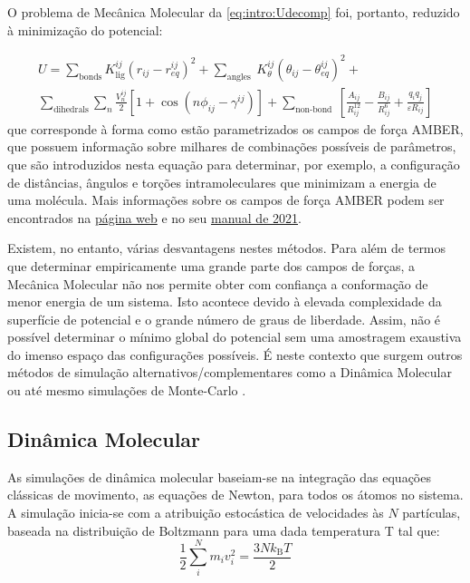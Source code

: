 \documentclass[12pt,a4paper]{article}
\begin{document}
	O problema de Mecânica Molecular da \cref{eq:intro:Udecomp} foi, portanto, reduzido à minimização do potencial:
	
	\begin{equation}
		\begin{gathered}
			U=\sum_{\textrm{bonds}} K_{\textrm{lig}}^{ij}\left(r_{ij}-r_{e q}^{ij}\right)^{2}+\sum_{\text {angles }} K_{\theta}^{ij}\left(\theta_{ij}-\theta_{e q}^{ij}\right)^{2}+\\
			\sum_{\text {dihedrals}} \sum_{n} \frac{V_{n}^{ij}}{2}[1+\cos (n \phi_{ij}-\gamma^{ij})]+\sum_{\text {non-bond }}\left[\frac{A_{i j}}{R_{i j}^{12}}-\frac{B_{i j}}{R_{i j}^{6}}+\frac{q_{i} q_{j}}{\varepsilon R_{i j}}\right]
		\end{gathered}
	\end{equation}
	que corresponde à forma como estão parametrizados os campos de força AMBER, que possuem informação sobre milhares de combinações possíveis de parâmetros, que são introduzidos nesta equação para determinar, por exemplo, a configuração de distâncias, ângulos e torções intramoleculares que minimizam a energia de uma molécula. Mais informações sobre os campos de força AMBER podem ser encontrados na \href{https://ambermd.org/AmberModels.php}{página web} e no seu \href{https://ambermd.org/doc12/Amber21.pdf#page=264}{manual de 2021}.
	
	Existem, no entanto, várias desvantagens nestes métodos. Para além de termos que determinar empiricamente uma grande parte dos campos de forças, a Mecânica Molecular não nos permite obter com confiança a conformação de menor energia de um sistema. Isto acontece devido à elevada complexidade da superfície de potencial e o grande número de graus de liberdade. Assim, não é possível determinar o mínimo global do potencial sem uma amostragem exaustiva do imenso espaço das configurações possíveis.%
	É neste contexto que surgem outros métodos de simulação alternativos/complementares como a Dinâmica Molecular \cite{cheathamMolecularModelingNucleic2001,galindo-murilloMolecularModelingNucleic2014} ou até mesmo simulações de Monte-Carlo \cite{tenekedjievApplicationsMonteCarlo2011}.
	
\subsection{Dinâmica Molecular}
	As simulações de dinâmica molecular baseiam-se na integração das equações clássicas de movimento, as equações de Newton, para todos os átomos no sistema. A simulação inicia-se com a atribuição estocástica de velocidades às $N$ partículas, baseada na distribuição de Boltzmann para uma dada temperatura T tal que:
	\begin{equation}
		\frac{1}{2} \sum_{i}^{N} m_{i} v_{i}^{2}=\frac{3 N k_{\mathrm{B}} T}{2}
	\end{equation}
	
\end{document}
